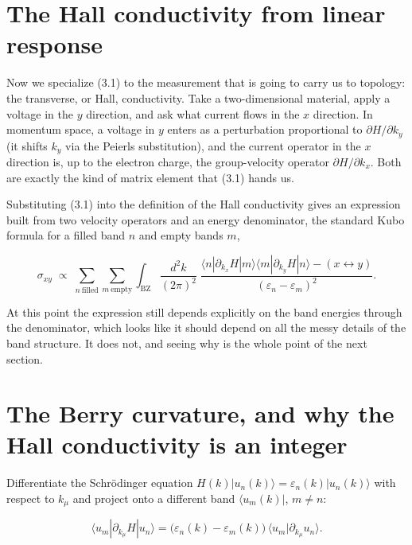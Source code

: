 \section{The Hall conductivity from linear response}

Now we specialize (3.1) to the measurement that is going to carry us to topology: the transverse, or
Hall, conductivity. Take a two-dimensional material, apply a voltage in the $y$ direction, and ask
what current flows in the $x$ direction. In momentum space, a voltage in $y$ enters as a perturbation
proportional to $\partial H/\partial k_y$ (it shifts $k_y$ via the Peierls substitution), and the
current operator in the $x$ direction is, up to the electron charge, the group-velocity operator
$\partial H/\partial k_x$. Both are exactly the kind of matrix element that (3.1) hands us.

Substituting (3.1) into the definition of the Hall conductivity gives an expression built from two
velocity operators and an energy denominator, the standard Kubo formula for a filled band $n$ and
empty bands $m$,

\begin{equation}
\sigma_{xy} \;\propto\; \sum_{n\ \text{filled}} \sum_{m\ \text{empty}} \int_{\text{BZ}}
\frac{d^2k}{(2\pi)^2}\;
\frac{\langle n|\partial_{k_x}H|m\rangle\langle m|\partial_{k_y}H|n\rangle - (x\leftrightarrow y)}
{(\varepsilon_n - \varepsilon_m)^2}.
\end{equation}

At this point the expression still depends explicitly on the band energies through the denominator,
which looks like it should depend on all the messy details of the band structure. It does not, and
seeing why is the whole point of the next section.

\section{The Berry curvature, and why the Hall conductivity is an integer}

Differentiate the Schrödinger equation $H(k)|u_n(k)\rangle = \varepsilon_n(k)|u_n(k)\rangle$ with
respect to $k_\mu$ and project onto a different band $\langle u_m(k)|$, $m \neq n$:

\begin{equation}
\langle u_m|\partial_{k_\mu} H|u_n\rangle
= \big(\varepsilon_n(k) - \varepsilon_m(k)\big)\,\langle u_m|\partial_{k_\mu} u_n\rangle.
\end{equation}

